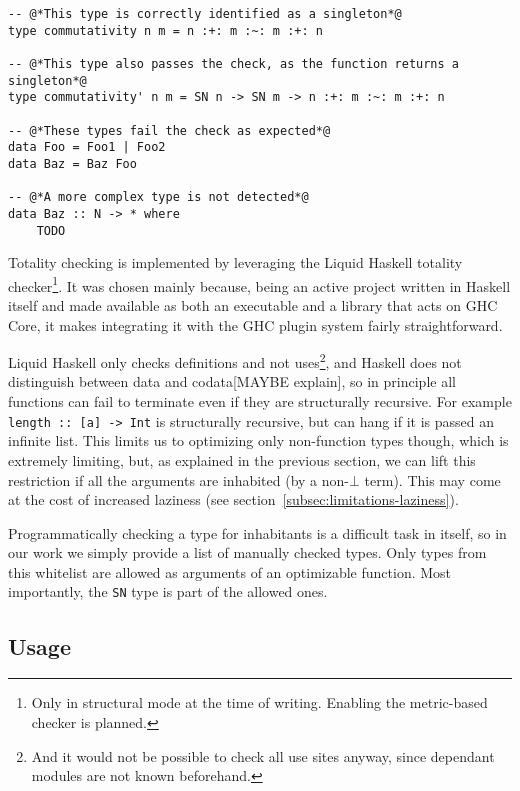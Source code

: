 \begin{lstlisting}[caption=Some examples of singleton detection]
-- @*This type is correctly identified as a singleton*@
type commutativity n m = n :+: m :~: m :+: n

-- @*This type also passes the check, as the function returns a singleton*@
type commutativity' n m = SN n -> SN m -> n :+: m :~: m :+: n

-- @*These types fail the check as expected*@
data Foo = Foo1 | Foo2
data Baz = Baz Foo

-- @*A more complex type is not detected*@
data Baz :: N -> * where
    TODO
\end{lstlisting}

Totality checking is implemented by leveraging the Liquid Haskell\cite{refinement-types-for-haskell} totality checker\footnote{Only in structural mode at the time of writing. Enabling the metric-based checker is planned.}.
It was chosen mainly because, being an active project written in Haskell itself and made available as both an executable and a library that acts on GHC Core, it makes integrating it with the GHC plugin system fairly straightforward.

Liquid Haskell only checks definitions and not uses\footnote{And it would not be possible to check all use sites anyway, since dependant modules are not known beforehand.}, and Haskell does not distinguish between data and codata[MAYBE explain], so in principle all functions can fail to terminate even if they are structurally recursive. For example \texttt{length :: [a] -> Int} is structurally recursive, but can hang if it is passed an infinite list.
This limits us to optimizing only non-function types though, which is extremely limiting, but, as explained in the previous section, we can lift this restriction if all the arguments are inhabited (by a non-$\bot$ term).
This may come at the cost of increased laziness (see section~\ref{subsec:limitations-laziness}).

Programmatically checking a type for inhabitants is a difficult task in itself, so in our work we simply provide a list of manually checked types.
Only types from this whitelist are allowed as arguments of an optimizable function.
Most importantly, the \texttt{SN} type is part of the allowed ones.

\subsection{Usage}
\label{subsec:usage}

